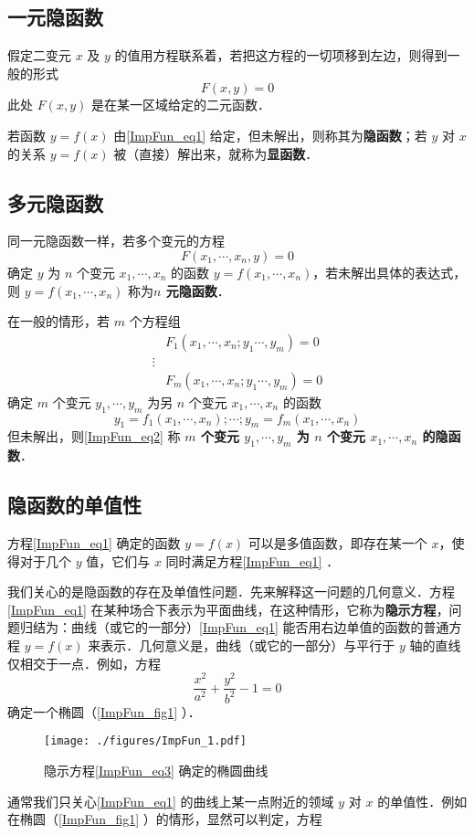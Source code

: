
\subsection{一元隐函数}
假定二变元 $x$ 及 $y$ 的值用方程联系着，若把这方程的一切项移到左边，则得到一般的形式
\begin{equation}\label{ImpFun_eq1}
F(x,y)=0
\end{equation}
此处 $F(x,y)$ 是在某一区域给定的二元函数．

若函数 $y=f(x)$ 由\autoref{ImpFun_eq1} 给定，但未解出，则称其为\textbf{隐函数}；若 $y$ 对 $x$ 的关系 $y=f(x)$ 被（直接）解出来，就称为\textbf{显函数}．
\subsection{多元隐函数}
同一元隐函数一样，若多个变元的方程
\begin{equation}
F(x_1,\cdots,x_n,y)=0
\end{equation}
确定 $y$ 为 $n$ 个变元 $x_1,\cdots,x_n$ 的函数 $y=f(x_1,\cdots,x_n)$，若未解出具体的表达式，则 $y=f(x_1,\cdots,x_n)$ 称为\textbf{$n$ 元隐函数}． 

在一般的情形，若 $m$ 个方程组
\begin{equation}
\begin{aligned}
&F_1(x_1,\cdots,x_n;y_1\cdots,y_m)=0\\
\vdots\\
&F_m(x_1,\cdots,x_n;y_1\cdots,y_m)=0
\end{aligned}
\end{equation}
确定 $m$ 个变元 $y_1,\cdots,y_m$ 为另 $n$ 个变元 $x_1,\cdots,x_n$ 的函数
\begin{equation}\label{ImpFun_eq2}
y_1=f_1(x_1,\cdots,x_n);\cdots;y_m=f_m(x_1,\cdots,x_n)
\end{equation}
但未解出，则\autoref{ImpFun_eq2} 称\textbf{ $m$ 个变元 $y_1,\cdots,y_m$ 为 $n$ 个变元 $x_1,\cdots,x_n$ 的隐函数}． 
\subsection{隐函数的单值性}
方程\autoref{ImpFun_eq1} 确定的函数 $y=f(x)$ 可以是多值函数，即存在某一个 $x$，使得对于几个 $y$ 值，它们与 $x$ 同时满足方程\autoref{ImpFun_eq1} ．

我们关心的是隐函数的存在及单值性问题．先来解释这一问题的几何意义．方程\autoref{ImpFun_eq1} 在某种场合下表示为平面曲线，在这种情形，它称为\textbf{隐示方程}，问题归结为：曲线（或它的一部分）\autoref{ImpFun_eq1} 能否用右边单值的函数的普通方程 $y=f(x)$ 来表示．几何意义是，曲线（或它的一部分）与平行于 $y$ 轴的直线仅相交于一点．例如，方程 
\begin{equation}\label{ImpFun_eq3}
\frac{x^2}{a^2}+\frac{y^2}{b^2}-1=0
\end{equation}
确定一个椭圆（\autoref{ImpFun_fig1} ）．
\begin{figure}[ht]
\centering
\texttt{[image: ./figures/ImpFun\_1.pdf]}
\caption{隐示方程\autoref{ImpFun_eq3} 确定的椭圆曲线} \label{ImpFun_fig1}
\end{figure}
通常我们只关心\autoref{ImpFun_eq1} 的曲线上某一点附近的领域 $y$ 对 $x$ 的单值性．例如在椭圆（\autoref{ImpFun_fig1} ）的情形，显然可以判定，方程